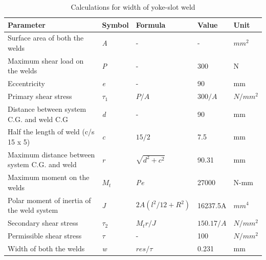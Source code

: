 \documentclass [12pt] {report}
\begin{document}
\begin{enumerate}[I]
\begin{longtable}{|l|l|l|l|l|}
\caption{Calculations for width of yoke-slot weld}\\
\hline 
\textbf{Parameter} & \textbf{Symbol} & \textbf{Formula} & \textbf{Value} & \textbf{Unit}\\
\hline
\hline
Surface area of both the welds & \textit{A} & - & - & $mm^2$ \\
\hline
Maximum shear load on the welds & \textit{P} & - & 300 & N\\
\hline
Eccentricity & \textit{e} & - & 90 & mm\\
\hline
Primary shear stress & $\tau_1$ & $\textit{P/A}$ & $300/\textit{A}$ & $N/mm^2$\\ 
\hline
Distance between system C.G. and weld C.G  & \textit{d} & - & 90 & mm\\
\hline
Half the length of weld (c/s 15 x 5) & \textit{c} & $15/2$ & 7.5 & mm\\
\hline
Maximum distance between system C.G. and weld & \textit{r} & $\sqrt{d^2 + c^2}$ & 90.31 & mm\\
\hline
Maximum moment on the welds & \textit{$M_t$} & \textit{Pe} & 27000 & N-mm\\
\hline
Polar moment of inertia of the weld system & \textit{J} & $2A(l^2/12 + R^2)$ & 16237.5A & $mm^4$\\
\hline
Secondary shear stress & $\tau_2$ & \textit{$M_t$}\textit{$r/J$}& $150.17/A$ & $N/mm^2$\\
\hline
Permissible shear stress & $\tau$ & - & 100 & $N/mm^2$\\
\hline
Width of both the welds & \textit{w} & $\textit{res}/\tau$ & 0.231 & mm\\
\hline 
\end{longtable}

\end{enumerate}

\end{document}
